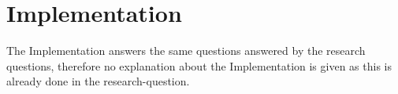 \hypertarget{implementation}{%
\chapter{Implementation}\label{implementation}}

The Implementation answers the same questions answered by the research
questions, therefore no explanation about the Implementation is given as
this is already done in the research-question.
